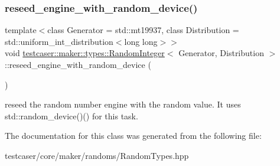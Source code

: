 \subsubsection{\texorpdfstring{reseed\_engine\_with\_random\_device()}{reseed\_engine\_with\_random\_device()}}
{\footnotesize\ttfamily template$<$class Generator = std\+::mt19937, class Distribution = std\+::uniform\+\_\+int\+\_\+distribution$<$long long$>$$>$ \\
void \mbox{\hyperlink{classtestcaser_1_1maker_1_1types_1_1RandomInteger}{testcaser\+::maker\+::types\+::\+Random\+Integer}}$<$ Generator, Distribution $>$\+::reseed\+\_\+engine\+\_\+with\+\_\+random\+\_\+device (\begin{DoxyParamCaption}{ }\end{DoxyParamCaption})\hspace{0.3cm}{\ttfamily [inline]}}



reseed the random number engine with the random value. It uses std\+::random\+\_\+device()() for this task. 



The documentation for this class was generated from the following file\+:\begin{DoxyCompactItemize}
\item 
testcaser/core/maker/randoms/Random\+Types.\+hpp\end{DoxyCompactItemize}
